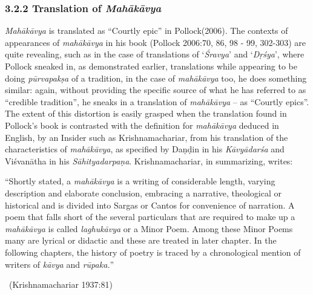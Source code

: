 \subsubsection*{3.2.2 Translation of \textit{Mahākāvya}}

\textit{Mahākāvya} is translated as “Courtly epic” in Pollock(2006). The contexts of appearances of \textit{mahākāvya} in his book (Pollock 2006:70, 86, 98 - 99, 302-303) are quite revealing, such as in the case of translations of ‘\textit{Śravya}’ and ‘\textit{Dṛśya}’, where Pollock sneaked in, as demonstrated earlier, translations while appearing to be doing \textit{pūrvapakṣa} of a tradition, in the case of \textit{mahākāvya} too, he does something similar: again, without providing the specific source of what he has referred to as “credible tradition”, he sneaks in a translation of \textit{mahākāvya} – as “Courtly epics”. The extent of this distortion is easily grasped when the translation found in Pollock’s book is contrasted with the definition for \textit{mahākāvya} deduced in English, by an Insider such as Krishnamachariar, from his translation of the characteristics of \textit{mahākāvya}, as specified by Daṇḍin in his \textit{Kāvyādarśa} and Viśvanātha in his \textit{Sāhityadarpaṇa}. Krishnamachariar, in summarizing, writes:

\begin{myquote}
“Shortly stated, a \textit{mahākāvya} is a writing of considerable length, varying description and elaborate conclusion, embracing a narrative, theological or historical and is divided into Sargas or Cantos for convenience of narration. A poem that falls short of the several particulars that are required to make up a \textit{mahākāvya} is called \textit{laghukāvya} or a Minor Poem. Among these Minor Poems many are lyrical or didactic and these are treated in later chapter. In the following chapters, the history of poetry is traced by a chronological mention of writers of \textit{kāvya} and \textit{rūpaka.}” 

~\hfill (Krishnamachariar 1937:81)
\end{myquote}

